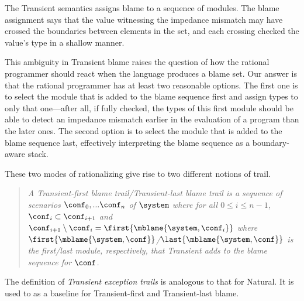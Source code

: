 
The Transient semantics assigns blame to a sequence of modules. The blame
assignment says that the value witnessing the impedance mismatch may have
crossed the boundaries between elements in the set, and each crossing
checked the value's type in a shallow manner.

This ambiguity in Transient blame raises the question of how the rational
programmer should react when the language produces a blame set. Our answer
is that the rational programmer has at least two reasonable options. The first
one is to select the module that is added to the blame sequence first and
assign types to only that one---after all, if fully checked, the types of this
first module should be able to detect an impedance mismatch earlier in the
evaluation of a program than the later ones. The second option is to select the
module that is added to the blame sequence last, effectively interpreting the
blame sequence as a boundary-aware stack.

These two modes of rationalizing give rise to two different notions of trail.

\begin{quote}
\it A \emph{Transient-first blame trail}/\emph{Transient-last blame trail} is a sequence of scenarios
$\conf_0,...\conf_n$ of $\system$ where for all $0 \leq i \leq n - 1$,
$\conf_i \subset \conf_{i+1}$ and $\conf_{i+1} \setminus \conf_i =
\first{\mblame{\system, \conf_i}}$ where $\first{\mblame{\system,
\conf}}$/$\last{\mblame{\system, \conf}}$ is the
first/last module, respectively,  that Transient adds to the blame sequence for $\conf$.
\end{quote}


The definition of \emph{Transient exception trails} is analogous to that for
Natural. It is used to as a baseline for Transient-first and Transient-last
blame.
